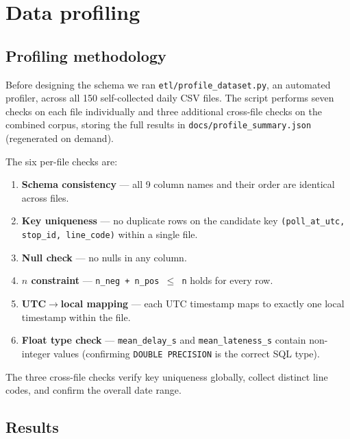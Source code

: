\documentclass[a4paper,11pt]{article}
\begin{document}
\newpage
\section{Data profiling}
\label{sec:profiling}

\subsection{Profiling methodology}

Before designing the schema we ran \texttt{etl/profile\_dataset.py}, an automated
profiler, across all 150 self-collected daily CSV files.
The script performs seven checks on each file individually and three additional
cross-file checks on the combined corpus, storing the full results in
\texttt{docs/profile\_summary.json} (regenerated on demand).

The six per-file checks are:
\begin{enumerate}
  \item \textbf{Schema consistency} --- all 9 column names and their order are
    identical across files.
  \item \textbf{Key uniqueness} --- no duplicate rows on the candidate key
    \texttt{(poll\_at\_utc, stop\_id, line\_code)} within a single file.
  \item \textbf{Null check} --- no nulls in any column.
  \item \textbf{$n$ constraint} --- \texttt{n\_neg + n\_pos $\leq$ n} holds for
    every row.
  \item \textbf{UTC$\to$local mapping} --- each UTC timestamp maps to exactly one
    local timestamp within the file.
  \item \textbf{Float type check} --- \texttt{mean\_delay\_s} and
    \texttt{mean\_lateness\_s} contain non-integer values (confirming
    \texttt{DOUBLE PRECISION} is the correct SQL type).
\end{enumerate}
The three cross-file checks verify key uniqueness globally, collect distinct line
codes, and confirm the overall date range.

\subsection{Results}
\end{document}
